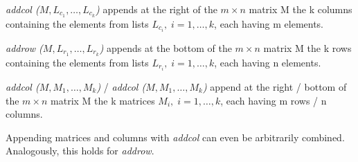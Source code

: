 \documentclass[../Maxima_Workbook.tex]{subfiles}
\begin{document}
 \hfill \tcr{[function]}

\lz \emph{addcol ($ M, L_{c_1},\dots, L_{c_k} $)} appends at the right of the $ m \times n  $ matrix M the k columns containing the elements from lists $ L_{c_i}, \; i=1,\dots,k $, each having m elements.

\lz \emph{addrow ($ M, L_{r_1},\dots, L_{r_k} $)} appends at the bottom of the $ m \times n  $ matrix M the k rows containing the elements from lists $ L_{r_i}, \; i=1,\dots,k $, each having n elements.

\lz \emph{addcol ($ M, M_1,\dots, M_k $)} / \emph{addcol ($ M, M_1,\dots, M_k $)} append at the right / bottom of the $ m \times n  $ matrix M the k matrices $ M_i, \; i=1,\dots,k $, each having m rows / n columns.

\lz Appending matrices and columns with \emph{addcol} can even be arbitrarily combined. Analogously, this holds for \emph{addrow}.
\end{document}
